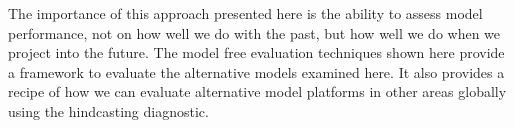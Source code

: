 The importance of this approach presented here is the ability to assess model performance, not on how well we do with the past, but how well we do when we project into the future. The model free evaluation techniques shown here provide a framework to evaluate the alternative models examined here. It also provides a recipe of how we can evaluate alternative model platforms in other areas globally using the hindcasting diagnostic.


